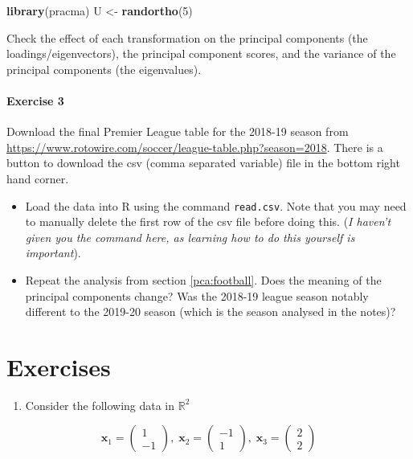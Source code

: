 \documentclass[
]{book}
\newenvironment{Shaded}{\begin{snugshade}}{\end{snugshade}}
\newcommand{\DecValTok}[1]{\textcolor[rgb]{0.00,0.00,0.81}{#1}}
\newcommand{\FunctionTok}[1]{\textcolor[rgb]{0.13,0.29,0.53}{\textbf{#1}}}
\newcommand{\NormalTok}[1]{#1}
\newcommand{\OtherTok}[1]{\textcolor[rgb]{0.56,0.35,0.01}{#1}}
\providecommand{\tightlist}{%
  \setlength{\itemsep}{0pt}\setlength{\parskip}{0pt}}
\theoremstyle{definition}
\theoremstyle{definition}
\theoremstyle{definition}
\theoremstyle{definition}
\theoremstyle{remark}
\begin{document}
\begin{Shaded}
\begin{Highlighting}[]
\FunctionTok{library}\NormalTok{(pracma)}
\NormalTok{U }\OtherTok{\textless{}{-}} \FunctionTok{randortho}\NormalTok{(}\DecValTok{5}\NormalTok{)}
\end{Highlighting}
\end{Shaded}

Check the effect of each transformation on the principal components (the loadings/eigenvectors), the principal component scores, and the variance of the principal components (the eigenvalues).

\hypertarget{exercise-3}{%
\paragraph*{Exercise 3}\label{exercise-3}}

Download the final Premier League table for the 2018-19 season from
\url{https://www.rotowire.com/soccer/league-table.php?season=2018}. There is a button to download the csv (comma separated variable) file in the bottom right hand corner.

\begin{itemize}
\item
  Load the data into R using the command \texttt{read.csv}. Note that you may need to manually delete the first row of the csv file before doing this. (\emph{I haven't given you the command here, as learning how to do this yourself is important}).
\item
  Repeat the analysis from section \ref{pca:football}. Does the meaning of the principal components change? Was the 2018-19 league season notably different to the 2019-20 season (which is the season analysed in the notes)?
\end{itemize}

\hypertarget{exercises-1}{%
\section{Exercises}\label{exercises-1}}

\begin{enumerate}
\def\labelenumi{\arabic{enumi}.}
\tightlist
\item
  Consider the following data in \(\mathbb{R}^2\)
\end{enumerate}

\[\mathbf x_1 =\begin{pmatrix}1\\-1\end{pmatrix},\; \mathbf x_2 =\begin{pmatrix}-1\\1\end{pmatrix},
\;\mathbf x_3 =\begin{pmatrix}2\\2\end{pmatrix}\]
\end{document}
